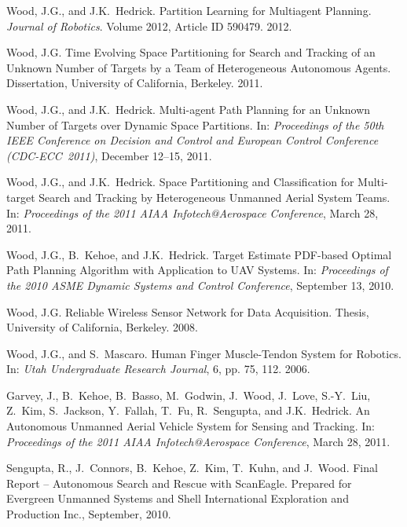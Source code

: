 \begin{bibsection}
	\item Wood, J.G., and J.K.~Hedrick. Partition Learning for Multiagent Planning. \emph{Journal of Robotics}. Volume 2012, Article ID 590479. 2012. 
	
    \item Wood, J.G. Time Evolving Space Partitioning for Search and Tracking of an
		Unknown Number of Targets by a Team of Heterogeneous Autonomous Agents. Dissertation, 				University of California, Berkeley. 2011.
	
	\item Wood, J.G., and J.K.~Hedrick. Multi-agent Path Planning for an
    	Unknown Number of Targets over Dynamic Space Partitions.
        In: \emph{Proceedings of the 50th IEEE Conference on Decision
        and Control and European Control Conference (CDC-ECC~2011)},
        December 12--15, 2011.

    \item Wood, J.G., and J.K.~Hedrick. Space Partitioning and Classification
    	for Multi-target Search and Tracking by Heterogeneous Unmanned Aerial
    	System Teams. In: \emph{Proceedings of the 2011 AIAA Infotech@Aerospace
    	Conference}, March 28, 2011.
	
	\item Wood, J.G., B.~Kehoe, and J.K.~Hedrick. Target Estimate PDF-based
    	Optimal Path Planning Algorithm with Application to UAV Systems. In:
    	\emph{Proceedings of the 2010 ASME Dynamic Systems and Control Conference},
        September 13, 2010.

    \item Wood, J.G. Reliable Wireless Sensor Network for Data Acquisition. Thesis,
		University of California, Berkeley. 2008.
	
	\item Wood, J.G., and S.~Mascaro. Human Finger Muscle-Tendon System for Robotics.
		In: \emph{Utah Undergraduate Research Journal}, 6, pp. 75, 112. 2006.
	
	\item Garvey, J., B.~Kehoe, B.~Basso, M.~Godwin, J.~Wood, J.~Love, S.-Y.~Liu,
    	Z.~Kim, S.~Jackson, Y.~Fallah, T.~Fu, R.~Sengupta, and J.K.~Hedrick. An
    	Autonomous Unmanned Aerial Vehicle System for Sensing and Tracking. In:
    	\emph{Proceedings of the 2011 AIAA Infotech@Aerospace Conference},
        March 28, 2011.
    	
	\item Sengupta, R., J.~Connors, B.~Kehoe, Z.~Kim, T.~Kuhn, and J.~Wood.
        Final Report -- Autonomous Search and Rescue with ScanEagle. Prepared for
        Evergreen Unmanned Systems and Shell International Exploration and
        Production Inc., September, 2010.
\end{bibsection}